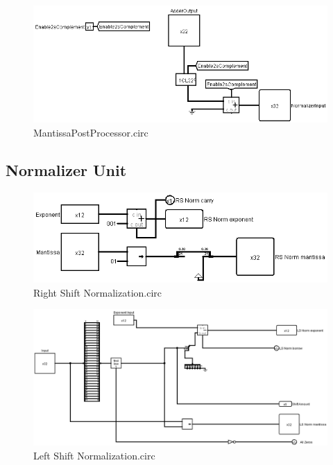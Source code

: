\documentclass[18pt]{article}
\begin{document}
\begin{figure}[!h]
    \centering
    \captionsetup{font=Large}
    \includegraphics[scale=0.2]{Util/MantissaPostProcessor.png}
    \caption{MantissaPostProcessor.circ}
\end{figure}

\subsection{Normalizer Unit}
\begin{figure}[!h]
    \centering
    \captionsetup{font=Large}
    \includegraphics[scale=0.2]{Util/RS Normalizer.png}
    \caption{Right Shift Normalization.circ}
\end{figure}
\begin{figure}[!h]
    \centering
    \captionsetup{font=Large}
    \includegraphics[scale=0.2]{Util/LS Normalizer.png}
    \caption{Left Shift Normalization.circ}
\end{figure}
\end{document}

